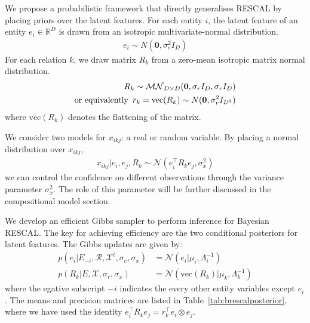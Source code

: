 We propose a probabilistic framework that directly generalises RESCAL
by placing priors over the
latent features. For each entity $i$, the latent feature of an entity $e_i \in
\mathbb{R}^{D}$ is drawn from an isotropic multivariate-normal distribution.
\begin{align}
\label{eqn:entity_gen}
e_i \sim {N}(\mathbf{0}, \sigma_e^2{I}_D)
\end{align}
For each relation $k$, we draw matrix $R_k$ from
a zero-mean isotropic matrix normal distribution.
\begin{align}
\label{eqn:relation_gen}
R_k \sim \mathcal{MN}_{D \times D}(\mathbf{0}, \sigma_r{I}_D, \sigma_r{I}_D) \\
\text{or equivalently}\enspace r_k  = \text{vec}(R_k) \sim N(\mathbf{0}, \sigma_r^2 I_{D^2}) \notag
\end{align}
where $\text{vec}(R_k)$ denotes the flattening of the matrix.

We consider two models for $x_{ikj}$: a real or random variable. By placing a
normal distribution over $x_{ikj}$,
\begin{align}
  x_{ikj} |e_i, e_j, R_k \sim \mathcal{N}(e_i^{\top} R_k e_j, \sigma_x^2) \label{eqn:triple_gen}
\end{align}
we can control the confidence on different observations
through the variance parameter $\sigma_x^2$.
The role of this parameter will be further discussed in the compositional model section.

We develop an efficient Gibbs sampler to perform inference for Bayesian RESCAL.
The key for achieving efficiency are the two conditional posteriors for latent features.
The Gibbs updates are given by:
\begin{align*}
p(e_i |E_{-i}, \mathcal{R}, \mathcal{X}^{t}, \sigma_e, \sigma_x) &= \mathcal{N}(e_i | \mu_i,
\Lambda_i^{-1}) \\
p(R_k|E, \mathcal{X}, \sigma_r, \sigma_x) &= \mathcal{N}(\text{vec}(R_k) |
\mu_k, \Lambda_k^{-1})
\end{align*}
where the egative subscript $-i$ indicates the every other entity variables except $e_i$.
The means and precision matrices are listed in Table~\ref{tab:brescalposterior}, where we have
used the identity $e_i^{\top} R_k e_j = r_k^{\top} e_i \otimes e_j$.

